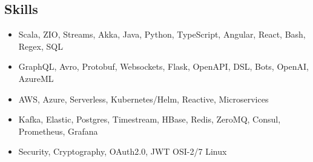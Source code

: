 \subsection*{Skills}

\begin{itemize}[noitemsep, nosep]
  \item Scala, ZIO, Streams, Akka, Java, Python, TypeScript, Angular, React, Bash, Regex, SQL
  \item GraphQL, Avro, Protobuf, Websockets, Flask, OpenAPI, DSL, Bots, OpenAI, AzureML
  \item AWS, Azure, Serverless, Kubernetes/Helm, Reactive, Microservices
  \item Kafka, Elastic, Postgres, Timestream, HBase, Redis, ZeroMQ, Consul, Prometheus, Grafana
  \item Security, Cryptography, OAuth2.0, JWT \textbar{} OSI-2/7 \textbar{} Linux
\end{itemize}